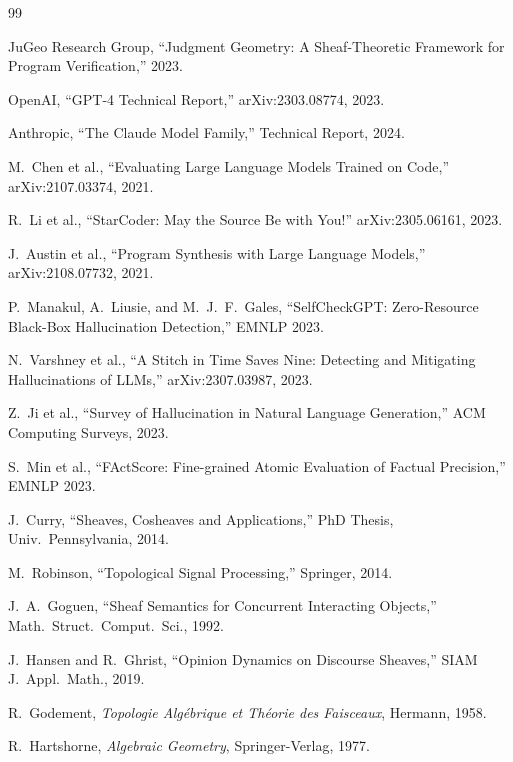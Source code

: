 \documentclass[11pt]{article}
\begin{document}
\begin{thebibliography}{99}

JuGeo Research Group, ``Judgment Geometry: A Sheaf-Theoretic Framework
for Program Verification,'' 2023.

OpenAI, ``GPT-4 Technical Report,'' arXiv:2303.08774, 2023.

Anthropic, ``The Claude Model Family,'' Technical Report, 2024.

M.~Chen et al., ``Evaluating Large Language Models Trained on Code,''
arXiv:2107.03374, 2021.

R.~Li et al., ``StarCoder: May the Source Be with You!''
arXiv:2305.06161, 2023.

J.~Austin et al., ``Program Synthesis with Large Language Models,''
arXiv:2108.07732, 2021.

P.~Manakul, A.~Liusie, and M.~J.~F.~Gales, ``SelfCheckGPT:
Zero-Resource Black-Box Hallucination Detection,'' EMNLP 2023.

N.~Varshney et al., ``A Stitch in Time Saves Nine: Detecting and
Mitigating Hallucinations of LLMs,'' arXiv:2307.03987, 2023.

Z.~Ji et al., ``Survey of Hallucination in Natural Language
Generation,'' ACM Computing Surveys, 2023.

S.~Min et al., ``FActScore: Fine-grained Atomic Evaluation of
Factual Precision,'' EMNLP 2023.

J.~Curry, ``Sheaves, Cosheaves and Applications,'' PhD Thesis,
Univ.\ Pennsylvania, 2014.

M.~Robinson, ``Topological Signal Processing,'' Springer, 2014.

J.~A.~Goguen, ``Sheaf Semantics for Concurrent Interacting Objects,''
Math.\ Struct.\ Comput.\ Sci., 1992.

J.~Hansen and R.~Ghrist, ``Opinion Dynamics on Discourse Sheaves,''
SIAM J.\ Appl.\ Math., 2019.

R.~Godement, \emph{Topologie Alg\'ebrique et Th\'eorie des Faisceaux},
Hermann, 1958.

R.~Hartshorne, \emph{Algebraic Geometry}, Springer-Verlag, 1977.


\end{thebibliography}
\end{document}
